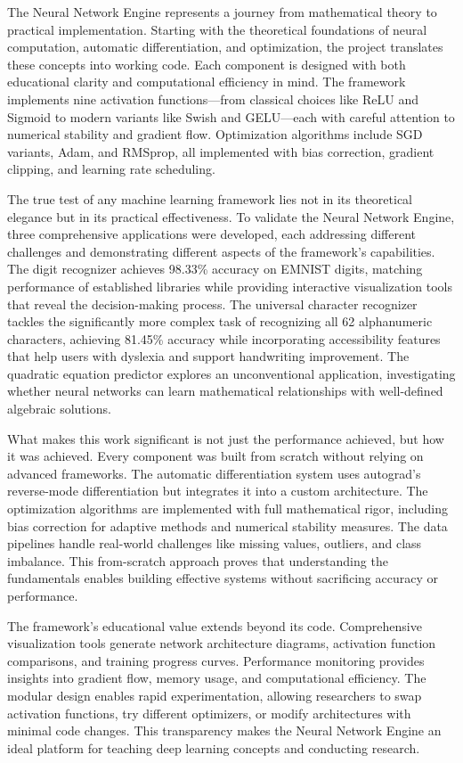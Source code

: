 \documentclass[11pt,a4paper]{report}
\begin{document}
The Neural Network Engine represents a journey from mathematical theory to practical implementation. Starting with the theoretical foundations of neural computation, automatic differentiation, and optimization, the project translates these concepts into working code. Each component is designed with both educational clarity and computational efficiency in mind. The framework implements nine activation functions—from classical choices like ReLU and Sigmoid to modern variants like Swish and GELU—each with careful attention to numerical stability and gradient flow. Optimization algorithms include SGD variants, Adam, and RMSprop, all implemented with bias correction, gradient clipping, and learning rate scheduling.

The true test of any machine learning framework lies not in its theoretical elegance but in its practical effectiveness. To validate the Neural Network Engine, three comprehensive applications were developed, each addressing different challenges and demonstrating different aspects of the framework's capabilities. The digit recognizer achieves 98.33\% accuracy on EMNIST digits, matching performance of established libraries while providing interactive visualization tools that reveal the decision-making process. The universal character recognizer tackles the significantly more complex task of recognizing all 62 alphanumeric characters, achieving 81.45\% accuracy while incorporating accessibility features that help users with dyslexia and support handwriting improvement. The quadratic equation predictor explores an unconventional application, investigating whether neural networks can learn mathematical relationships with well-defined algebraic solutions.

What makes this work significant is not just the performance achieved, but how it was achieved. Every component was built from scratch without relying on advanced frameworks. The automatic differentiation system uses autograd's reverse-mode differentiation but integrates it into a custom architecture. The optimization algorithms are implemented with full mathematical rigor, including bias correction for adaptive methods and numerical stability measures. The data pipelines handle real-world challenges like missing values, outliers, and class imbalance. This from-scratch approach proves that understanding the fundamentals enables building effective systems without sacrificing accuracy or performance.

The framework's educational value extends beyond its code. Comprehensive visualization tools generate network architecture diagrams, activation function comparisons, and training progress curves. Performance monitoring provides insights into gradient flow, memory usage, and computational efficiency. The modular design enables rapid experimentation, allowing researchers to swap activation functions, try different optimizers, or modify architectures with minimal code changes. This transparency makes the Neural Network Engine an ideal platform for teaching deep learning concepts and conducting research.
\end{document}
